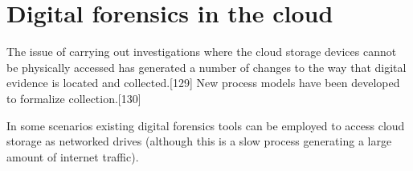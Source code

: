 \documentclass[11pt]{article}
\begin{document}
\section{\color{green}Digital forensics in the cloud}
The issue of carrying out investigations where the cloud storage devices cannot be physically accessed has generated a number of changes to the way that digital evidence is located and collected.[129] New process models have been developed to formalize collection.[130]

In some scenarios existing digital forensics tools can be employed to access cloud storage as networked drives (although this is a slow process generating a large amount of internet traffic).
\end{document}
